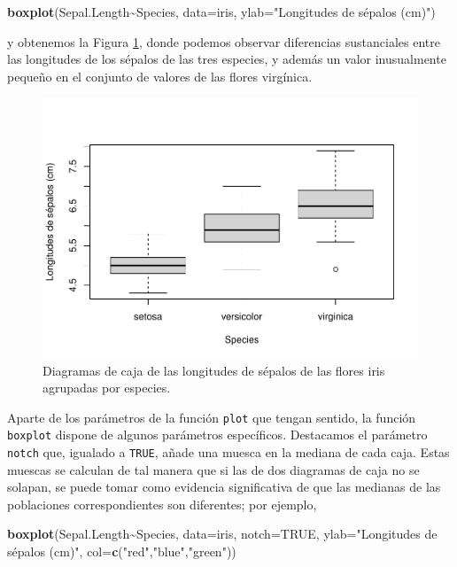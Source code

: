 \documentclass[
]{book}
\newenvironment{Shaded}{\begin{snugshade}}{\end{snugshade}}
\newcommand{\DataTypeTok}[1]{\textcolor[rgb]{0.13,0.29,0.53}{#1}}
\newcommand{\KeywordTok}[1]{\textcolor[rgb]{0.13,0.29,0.53}{\textbf{#1}}}
\newcommand{\NormalTok}[1]{#1}
\newcommand{\OperatorTok}[1]{\textcolor[rgb]{0.81,0.36,0.00}{\textbf{#1}}}
\newcommand{\OtherTok}[1]{\textcolor[rgb]{0.56,0.35,0.01}{#1}}
\newcommand{\StringTok}[1]{\textcolor[rgb]{0.31,0.60,0.02}{#1}}
\theoremstyle{definition}
\theoremstyle{definition}
\theoremstyle{definition}
\theoremstyle{remark}
\begin{document}
\begin{Shaded}
\begin{Highlighting}[]
\KeywordTok{boxplot}\NormalTok{(Sepal.Length}\OperatorTok{\textasciitilde{}}\NormalTok{Species, }\DataTypeTok{data=}\NormalTok{iris, }\DataTypeTok{ylab=}\StringTok{"Longitudes de sépalos (cm)"}\NormalTok{)}
\end{Highlighting}
\end{Shaded}

y obtenemos la Figura \ref{fig:187}, donde podemos observar diferencias sustanciales entre las longitudes de los sépalos de las tres especies, y además un valor inusualmente pequeño en el conjunto de valores de las flores virgínica.

\begin{figure}

{\centering \includegraphics[width=0.9\linewidth]{12chap12_Descripcion_cuantitativos_files/figure-latex/187-1} 

}

\caption{Diagramas de caja de las longitudes de sépalos de las flores iris agrupadas por especies.}\label{fig:187}
\end{figure}

Aparte de los parámetros de la función \texttt{plot} que tengan sentido,
la función \texttt{boxplot} dispone de algunos parámetros específicos. Destacamos el parámetro \texttt{notch} que, igualado a \texttt{TRUE}, añade una muesca en la mediana de cada caja. Estas muescas se calculan de tal manera que si las de dos diagramas de caja no se solapan, se puede tomar como evidencia significativa de que las medianas de las poblaciones correspondientes son diferentes; por ejemplo,

\begin{Shaded}
\begin{Highlighting}[]
\KeywordTok{boxplot}\NormalTok{(Sepal.Length}\OperatorTok{\textasciitilde{}}\NormalTok{Species, }\DataTypeTok{data=}\NormalTok{iris, }\DataTypeTok{notch=}\OtherTok{TRUE}\NormalTok{, }
        \DataTypeTok{ylab=}\StringTok{"Longitudes de sépalos (cm)"}\NormalTok{, }\DataTypeTok{col=}\KeywordTok{c}\NormalTok{(}\StringTok{"red"}\NormalTok{,}\StringTok{"blue"}\NormalTok{,}\StringTok{"green"}\NormalTok{))}
\end{Highlighting}
\end{Shaded}
\end{document}
